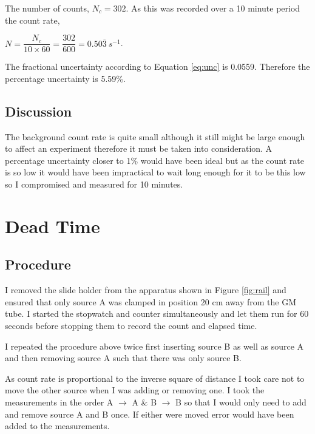 \documentclass[twocolumn]{revtex4-1}
\begin{document}
The number of counts, $N_{c}=302$. As this was recorded over a 10 minute period the count rate, 

\begin{center}
$N=\dfrac{N_{c}}{10\times60}=\dfrac{302}{600}=0.50\overline{3}\ s^{-1}$.
\end{center}

The fractional uncertainty according to Equation \ref{eq:unc} is 0.0559.
Therefore the percentage uncertainty is 5.59\%.

\vspace{-2ex}
\subsection{Discussion} 
\vspace{-3ex}

The background count rate is quite small although it still might be large enough to affect an experiment therefore it must be taken into consideration.
A percentage uncertainty closer to 1\% would have been ideal but as the count rate is so low it would have been impractical to wait long enough for it to be this low so I compromised and measured for 10 minutes.

\vspace{-3ex}
\section{Dead Time}

\vspace{-2ex}
\subsection{Procedure}
\vspace{-3ex}

I removed the slide holder from the apparatus shown in Figure \ref{fig:rail} and ensured that only source A was clamped in position 20 cm away from the GM tube.
I started the stopwatch and counter simultaneously and let them run for 60 seconds before stopping them to record the count and elapsed time.

I repeated the procedure above twice first inserting source B as well as source A and then removing source A such that there was only source B.

As count rate is proportional to the inverse square of distance\cite{inv} I took care not to move the other source when I was adding or removing one.
I took the measurements in the order A $\rightarrow$ A \& B $\rightarrow$ B so that I would only need to add and remove source A and B once.
If either were moved error would have been added to the measurements.
\end{document}
